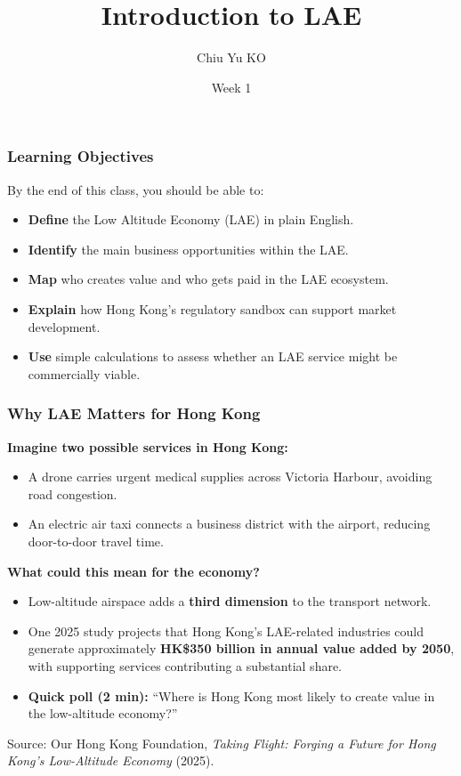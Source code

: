 \documentclass{beamer}
\begin{document}
\begin{frame}
    \title{Introduction to LAE}
    \author{Chiu Yu KO}
    \date{Week 1}
    
  \titlepage
\end{frame}

\begin{frame}[t]
  \frametitle{Learning Objectives}
  By the end of this class, you should be able to:
  \begin{itemize}
    \item \textbf{Define} the Low Altitude Economy (LAE) in plain English.
    \item \textbf{Identify} the main business opportunities within the LAE.
    \item \textbf{Map} who creates value and who gets paid in the LAE ecosystem.
    \item \textbf{Explain} how Hong Kong's regulatory sandbox can support market development.
    \item \textbf{Use} simple calculations to assess whether an LAE service might be commercially viable.
  \end{itemize}
\end{frame}

\begin{frame}[t]
  \frametitle{Why LAE Matters for Hong Kong}
  \textbf{Imagine two possible services in Hong Kong:}
  \begin{itemize}
      \item A drone carries urgent medical supplies across Victoria Harbour, avoiding road congestion.
      \item An electric air taxi connects a business district with the airport, reducing door-to-door travel time.
  \end{itemize}
  \vspace{0.3cm}
  \textbf{What could this mean for the economy?}
  \begin{itemize}
    \item Low-altitude airspace adds a \textbf{third dimension} to the transport network.
    \item One 2025 study projects that Hong Kong's LAE-related industries could generate approximately \textbf{HK\$350 billion in annual value added by 2050}, with supporting services contributing a substantial share.
    \item \textbf{Quick poll (2 min):} ``Where is Hong Kong most likely to create value in the low-altitude economy?''
  \end{itemize}
  \vfill
  {\tiny Source: Our Hong Kong Foundation, \textit{Taking Flight: Forging a Future for Hong Kong's Low-Altitude Economy} (2025).}
\end{frame}
\end{document}

